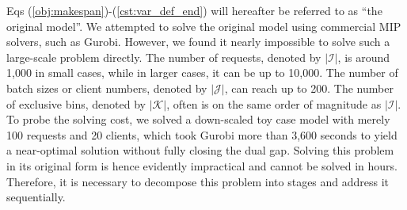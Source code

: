 Eqs (\ref{obj:makespan})-(\ref{cst:var_def_end}) will hereafter be referred to as ``the original model''. We attempted to solve the original model using commercial MIP solvers, such as Gurobi. However, we found it nearly impossible to solve such a large-scale problem directly. The number of requests, denoted by $|\mathcal{I}|$, is around 1,000 in small cases, while in larger cases, it can be up to 10,000. The number of batch sizes or client numbers, denoted by $|\mathcal{J}|$, can reach up to 200. The number of exclusive bins, denoted by $|\mathcal{K}|$, often is on the same order of magnitude as $|\mathcal{I}|$. %
To probe the solving cost, we solved a down-scaled toy case model with merely 100 requests and 20 clients, which took Gurobi more than 3,600 seconds to yield a near-optimal solution without fully closing the dual gap. Solving this problem in its original form is hence evidently impractical and cannot be solved in hours. Therefore, it is necessary to decompose this problem into stages and address it sequentially.
